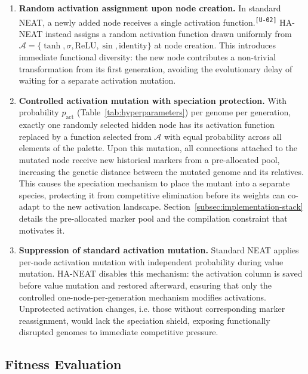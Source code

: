 \documentclass[12pt]{article}
\newcommand{\revID}[1]{\textsuperscript{\scriptsize\texttt{[#1]}}}
\newcommand{\revUnclear}[2]{\textcolor{revBlue}{#2}\revID{#1}}
\begin{document}
\begin{enumerate}
    \item \textbf{Random activation assignment upon node creation.} \revUnclear{U-02}{In standard NEAT, a newly added node receives a single activation function.} HA-NEAT instead assigns a random activation function drawn uniformly from $\mathcal{A} = \{\tanh, \sigma, \text{ReLU}, \sin, \text{identity}\}$ at node creation. This introduces immediate functional diversity: the new node contributes a non-trivial transformation from its first generation, avoiding the evolutionary delay of waiting for a separate activation mutation.
    
    \item \textbf{Controlled activation mutation with speciation protection.} With probability $p_{\text{act}}$ (Table~\ref{tab:hyperparameters}) per genome per generation, exactly one randomly selected hidden node has its activation function replaced by a function selected from
    $\mathcal{A}$ with equal probability across all elements of the palette. Upon this mutation, all connections attached to the mutated node receive new historical markers from a pre-allocated pool, increasing the genetic distance between the mutated genome and its relatives. This causes the speciation mechanism to place the mutant into a separate species, protecting it from competitive elimination before its weights can co-adapt to the new activation landscape. Section~\ref{subsec:implementation-stack} details the pre-allocated marker pool and the compilation constraint that motivates it.
    
    \item \textbf{Suppression of standard activation mutation.} Standard NEAT applies per-node activation mutation with independent probability during value mutation. HA-NEAT disables this mechanism: the activation column is saved before value mutation and restored afterward, ensuring that only the controlled one-node-per-generation mechanism modifies activations. Unprotected activation changes, i.e. those without corresponding marker reassignment, would lack the speciation shield, exposing functionally disrupted genomes to immediate competitive pressure.
\end{enumerate}


\subsection{Fitness Evaluation}
\label{subsec:fitness-evaluation}
\end{document}
